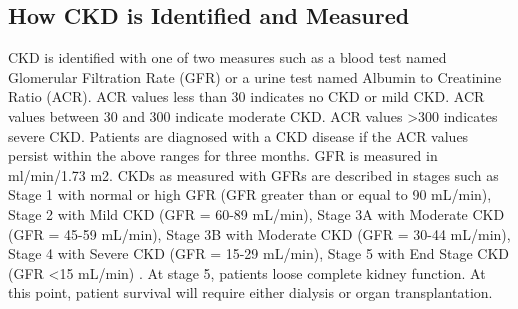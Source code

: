 \subsection *{How CKD is Identified and Measured}
CKD is identified with one of two measures such as a blood test named Glomerular Filtration Rate (GFR) or a urine test named Albumin to Creatinine Ratio (ACR).  ACR values less than 30 indicates no CKD or mild CKD. ACR values between 30 and 300 indicate moderate CKD. ACR values \textgreater 300 indicates severe CKD. Patients are diagnosed with a CKD disease if the ACR values persist within the above ranges for three months. GFR is measured in ml/min/1.73 m2. CKDs as measured with GFRs are described in stages such as Stage 1 with normal or high GFR (GFR greater than or equal to  90 mL/min), Stage 2 with Mild CKD (GFR = 60-89 mL/min), Stage 3A with Moderate CKD (GFR = 45-59 mL/min), Stage 3B with Moderate CKD (GFR = 30-44 mL/min), Stage 4 with Severe CKD (GFR = 15-29 mL/min), Stage 5 with End Stage CKD (GFR \textless 15 mL/min) \cite{Huangetal2013}. At stage 5, patients loose complete kidney function. At this point, patient survival will require either dialysis or organ transplantation.

